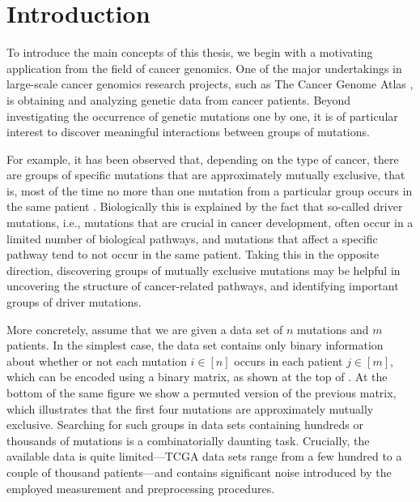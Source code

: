 \chapter{Introduction} \label{ch:intro}
To introduce the main concepts of this thesis, we begin with a motivating application from the field of cancer genomics.
One of the major undertakings in large-scale cancer genomics research projects, such as The Cancer Genome Atlas \citep{tcga}, is obtaining and analyzing genetic data from cancer patients.
Beyond investigating the occurrence of genetic mutations one by one, it is of particular interest to discover meaningful interactions between groups of mutations.

For example, it has been observed that, depending on the type of cancer, there are groups of specific mutations that are approximately mutually exclusive, that is, most of the time no more than one mutation from a particular group occurs in the same patient \citep{yeang08}.
Biologically this is explained by the fact that so-called driver mutations, i.e., mutations that are crucial in cancer development, often occur in a limited number of biological pathways, and mutations that affect a specific pathway tend to not occur in the same patient.
Taking this in the opposite direction, discovering groups of mutually exclusive mutations may be helpful in uncovering the structure of cancer-related pathways, and identifying important groups of driver mutations.

More concretely, assume that we are given a data set of $n$ mutations and $m$ patients.
In the simplest case, the data set contains only binary information about whether or not each mutation $i \in [n]$ occurs in each patient $j \in [m]$, which can be encoded using a binary matrix, as shown at the top of .
At the bottom of the same figure we show a permuted version of the previous matrix, which illustrates that the first four mutations are approximately mutually exclusive.
Searching for such groups in data sets containing hundreds or thousands of mutations is a combinatorially daunting task.
Crucially, the available data is quite limited---TCGA data sets range from a few hundred to a couple of thousand patients---and contains significant noise introduced by the employed measurement and preprocessing procedures.

